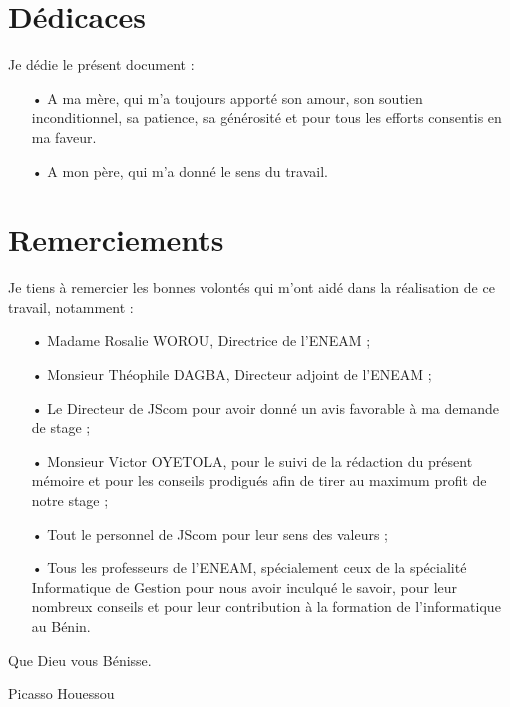 \documentclass[a4paper,12pt,french]{report} %
\begin{document}
\onehalfspacing %
\newcommand{\itemZ}{\item[\Large \textbf{\fbox{.}}]}


\chapter*{Dédicaces}
Je dédie le présent document :
\begin{itemize}
\item[•] A ma mère, qui m'a toujours apporté son amour, son soutien inconditionnel, sa patience, sa générosité et pour tous les efforts consentis en ma faveur.
\item[•] A mon père, qui m'a donné le sens du travail. 
\end{itemize}

\chapter*{Remerciements}
	Je tiens à remercier les bonnes volontés qui m'ont aidé dans la réalisation de ce travail, notamment :
\begin{itemize}
	\item[•] Madame Rosalie WOROU, Directrice de l'ENEAM ;
 	\item[•] Monsieur Théophile DAGBA, Directeur adjoint de l'ENEAM ;
	\item[•] Le Directeur de JScom pour avoir donné un avis favorable à ma demande de stage ;
	\item[•] Monsieur Victor OYETOLA, pour le suivi de la rédaction du présent mémoire et pour les conseils prodigués afin de tirer au maximum profit de notre stage ;
	\item[•] Tout le personnel de JScom pour leur sens des valeurs ;
	\item[•] Tous les professeurs de l'ENEAM, spécialement ceux de la spécialité Informatique de Gestion pour nous avoir inculqué le savoir, pour leur nombreux conseils et pour leur contribution à la formation de l'informatique au Bénin.	
\end{itemize}
Que Dieu vous Bénisse.
\begin{flushright}
Picasso Houessou
\end{flushright}
\end{document}
